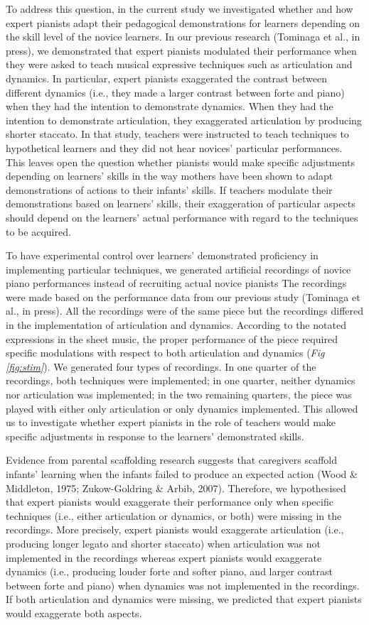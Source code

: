 \documentclass[
  man,floatsintext]{apa6}
\begin{document}
To address this question, in the current study we investigated whether and how expert pianists adapt their pedagogical demonstrations for learners depending on the skill level of the novice learners. In our previous research (Tominaga et al., in press), we demonstrated that expert pianists modulated their performance when they were asked to teach musical expressive techniques such as articulation and dynamics. In particular, expert pianists exaggerated the contrast between different dynamics (i.e., they made a larger contrast between forte and piano) when they had the intention to demonstrate dynamics. When they had the intention to demonstrate articulation, they exaggerated articulation by producing shorter staccato. In that study, teachers were instructed to teach techniques to hypothetical learners and they did not hear novices' particular performances. This leaves open the question whether pianists would make specific adjustments depending on learners' skills in the way mothers have been shown to adapt demonstrations of actions to their infants' skills. If teachers modulate their demonstrations based on learners' skills, their exaggeration of particular aspects should depend on the learners' actual performance with regard to the techniques to be acquired.

To have experimental control over learners' demonstrated proficiency in implementing particular techniques, we generated artificial recordings of novice piano performances instead of recruiting actual novice pianists The recordings were made based on the performance data from our previous study (Tominaga et al., in press). All the recordings were of the same piece but the recordings differed in the implementation of articulation and dynamics. According to the notated expressions in the sheet music, the proper performance of the piece required specific modulations with respect to both articulation and dynamics (\emph{Fig \ref{fig:stim}}). We generated four types of recordings. In one quarter of the recordings, both techniques were implemented; in one quarter, neither dynamics nor articulation was implemented; in the two remaining quarters, the piece was played with either only articulation or only dynamics implemented. This allowed us to investigate whether expert pianists in the role of teachers would make specific adjustments in response to the learners' demonstrated skills.

Evidence from parental scaffolding research suggests that caregivers scaffold infants' learning when the infants failed to produce an expected action (Wood \& Middleton, 1975; Zukow-Goldring \& Arbib, 2007). Therefore, we hypothesised that expert pianists would exaggerate their performance only when specific techniques (i.e., either articulation or dynamics, or both) were missing in the recordings. More precisely, expert pianists would exaggerate articulation (i.e., producing longer legato and shorter staccato) when articulation was not implemented in the recordings whereas expert pianists would exaggerate dynamics (i.e., producing louder forte and softer piano, and larger contrast between forte and piano) when dynamics was not implemented in the recordings. If both articulation and dynamics were missing, we predicted that expert pianists would exaggerate both aspects.
\end{document}

